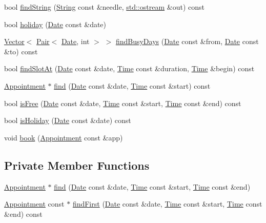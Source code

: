 \begin{DoxyCompactItemize}
\item 
bool \hyperlink{classCalendar_accc025455e06e4031b9b76fe1a35220d}{find\+String} (\hyperlink{classString}{String} const \&needle, \hyperlink{doctest_8h_a116af65cb5e924b33ad9d9ecd7a783f3}{std\+::ostream} \&out) const
\item 
bool \hyperlink{classCalendar_aa54f943234aebe06350ae6545804dd0a}{holiday} (\hyperlink{classDate}{Date} const \&date)
\item 
\hyperlink{classVector}{Vector}$<$ \hyperlink{structPair}{Pair}$<$ \hyperlink{classDate}{Date}, int $>$ $>$ \hyperlink{classCalendar_a33727e15bb2186dbdc1fe227dfa0a6e6}{find\+Busy\+Days} (\hyperlink{classDate}{Date} const \&from, \hyperlink{classDate}{Date} const \&to) const
\item 
bool \hyperlink{classCalendar_aecc060737b760817e814121df59a9316}{find\+Slot\+At} (\hyperlink{classDate}{Date} const \&date, \hyperlink{classTime}{Time} const \&duration, \hyperlink{classTime}{Time} \&begin) const
\item 
\hyperlink{classAppointment}{Appointment} $\ast$ \hyperlink{classCalendar_a249805cf48297698e30512ff9a47bac3}{find} (\hyperlink{classDate}{Date} const \&date, \hyperlink{classTime}{Time} const \&start) const
\item 
bool \hyperlink{classCalendar_abd5c6a36628d47bae770f807254fb639}{is\+Free} (\hyperlink{classDate}{Date} const \&date, \hyperlink{classTime}{Time} const \&start, \hyperlink{classTime}{Time} const \&end) const
\item 
bool \hyperlink{classCalendar_ae1d1e8979866bb2d03c4e66d801fdebf}{is\+Holiday} (\hyperlink{classDate}{Date} const \&date) const
\item 
void \hyperlink{classCalendar_a1dbd9019e73644ee8bf5611884ac5d75}{book} (\hyperlink{classAppointment}{Appointment} const \&app)
\end{DoxyCompactItemize}
\subsection*{Private Member Functions}
\begin{DoxyCompactItemize}
\item 
\hyperlink{classAppointment}{Appointment} $\ast$ \hyperlink{classCalendar_a9211e4068cad119ff203509c9cb50ef1}{find} (\hyperlink{classDate}{Date} const \&date, \hyperlink{classTime}{Time} const \&start, \hyperlink{classTime}{Time} const \&end)
\item 
\hyperlink{classAppointment}{Appointment} const  $\ast$ \hyperlink{classCalendar_a870fea13a7c605023a6b4cd70b5a9727}{find\+First} (\hyperlink{classDate}{Date} const \&date, \hyperlink{classTime}{Time} const \&start, \hyperlink{classTime}{Time} const \&end) const
\end{DoxyCompactItemize}
